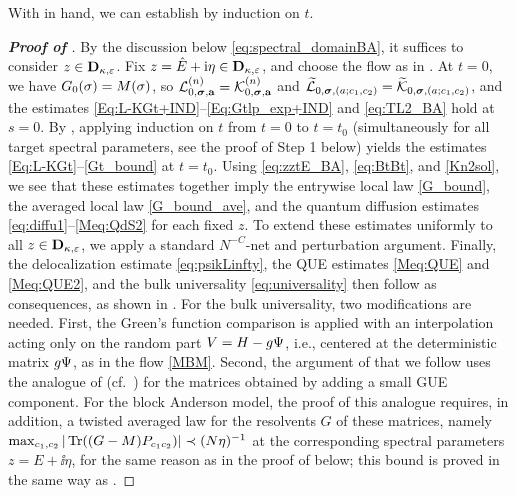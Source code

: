 
With  in hand, we can establish  by induction on $t$.  

\begin{proof}[\bf Proof of ]
By the discussion below \eqref{eq:spectral_domainBA}, it suffices to consider $z\in\mathbf D_{\kappa,{\varepsilon}}$. Fix $z=\hat{E}+\mathrm{i} \eta\in \mathbf D_{\kappa,{\varepsilon}}$, and choose the flow as in . At $t=0$, we have $G_0(\sigma)=M(\sigma)$, so ${\mathcal L}^{(n)}_{0,{\boldsymbol{\sigma}},{\mathbf{a}}}={\mathcal K}^{(n)}_{0,{\boldsymbol{\sigma}},{\mathbf{a}}}$ and $\widetilde{\mathcal L}_{0,{\boldsymbol{\sigma}},(a;c_1,c_2)}=\widetilde{\mathcal K}_{0,{\boldsymbol{\sigma}},(a;c_1,c_2)}$, and the estimates \eqref{Eq:L-KGt+IND}--\eqref{Eq:Gtlp_exp+IND} and \eqref{eq:TL2_BA} hold at $s=0$. By , applying induction on $t$ from $t=0$ to $t=t_0$ (simultaneously for all target spectral parameters, see the proof of Step 1 below) yields the estimates \eqref{Eq:L-KGt}--\eqref{Gt_bound} at $t=t_0$. Using \eqref{eq:zztE_BA}, \eqref{eq:BtBt}, and \eqref{Kn2sol}, we see that these estimates together imply the entrywise local law \eqref{G_bound}, the averaged local law \eqref{G_bound_ave}, and the quantum diffusion estimates \eqref{eq:diffu1}--\eqref{Meq:QdS2} for each fixed $z$. To extend these estimates uniformly to all $z\in \mathbf D_{\kappa,{\varepsilon}}$, we apply a standard $N^{-C}$-net and perturbation argument. Finally, the delocalization estimate \eqref{eq:psikLinfty}, the QUE estimates \eqref{Meq:QUE} and \eqref{Meq:QUE2}, and the bulk universality \eqref{eq:universality} then follow as consequences, as shown in . For the bulk universality, two modifications are needed. First, the Green's function comparison is applied with an interpolation acting only on the random part $V=H-g\Psi$, i.e., centered at the deterministic matrix $g\Psi$, as in the flow \eqref{MBM}. Second, the argument of \cite[Theorem~2.6]{YY_25} that we follow uses the analogue of \cite[Lemma~5.15]{YY_25} (cf.~) for the matrices obtained by adding a small GUE component. For the block Anderson model, the proof of this analogue requires, in addition, a twisted averaged law for the resolvents $G$ of these matrices, namely $\max_{c_1,c_2}|\operatorname{Tr}((G-M)P_{c_1c_2})|\prec (N\eta)^{-1}$ at the corresponding spectral parameters $z=E+\ii\eta$, for the same reason as in the proof of  below; this bound is proved in the same way as .
\end{proof}


